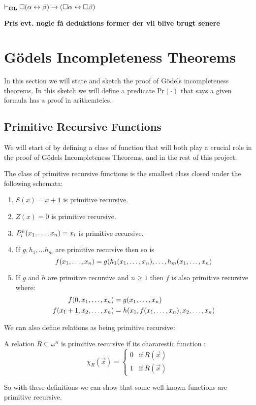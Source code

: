 \documentclass[../main.tex]{subfiles}
\begin{document}
\begin{prop}\label{prop:GL}
	$\vdash_{\text{\textbf{GL}}}\Box(\alpha\leftrightarrow\beta)\rightarrow(\Box\alpha\leftrightarrow\Box\beta)$
\end{prop}
\textbf{Pris evt. nogle få deduktions former der vil blive brugt senere}



\section{Gödels Incompleteness Theorems}
In this section we will state and sketch the proof of Gödels incompleteness
theorems. In this sketch we will define a predicate $\text{Pr}(\cdot)$ that
says a given formula has a proof in arithemteics.


\subsection{Primitive Recursive Functions}
We will start of by defining a class of function that will both play a crucial
role in the proof of Gödels Incompleteness Theorems, and in the rest of this
project. 
\begin{defi}
	The class of primitive recursive functions is the smallest class closed
	under the following schemata:
	\begin{enumerate}[label=\Roman*.]
		\item $S(x)=x+1$ is primitive recursive.
		\item $Z(x)=0$ is primitive recursive.
		\item $P^n_i(x_1,\ldots,x_n)=x_i$ is primitive recursive.
		\item If $g,h_1,\ldots h_m$ are primitive recursive then so
			is
			$$f(x_1,\ldots,x_n)=g(h_1(x_1,\ldots,x_n),\ldots,h_m(x_1,\ldots,x_n)$$
		\item If $g$ and $h$ are primitive recursive and $n\geq 1$ then
			$f$ is also primitive recursive where:
			\begin{align*}
				f(0,x_1,\ldots,x_n)&=g(x_1,\ldots,x_n)\\
				f(x_1+1,x_2,\ldots,x_n)&=h(x_1,f(x_1,\ldots,x_n),x_2,\ldots,x_n)
			\end{align*}
	\end{enumerate}
\end{defi}
We can also define relations as being primitive recursive:
\begin{defi}
	A relation $R\subseteq \omega^n$ is primitive recursive if its
	chararestic function :
	\[\chi_R(\vec{x})=\begin{cases}
		0 &\text{if}\ R(\vec{x})\\
		1 &\text{if}\ R(\vec x)
	\end{cases}\]
\end{defi}
So with these definitions we can show that some well known functions are
primitive recursive.
\end{document}
